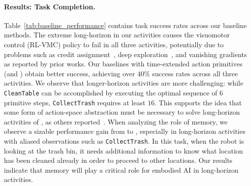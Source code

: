 \paragraph{Results: Task Completion.} Table~\ref{tab:baseline_performance} contains task success rates across our baseline methods. The extreme long-horizon in our activities causes the visuomotor control (RL-VMC) policy to fail in all three activities, potentially due to problems such as credit assignment~\cite{alipov2021towards}, deep exploration~\cite{yang2021exploration,JMLR:v20:18-339}, and vanishing gradients~\cite{10.1142/S0218488598000094} as reported by prior works.
Our baselines with time-extended action primitives (\rlprim and \rlprimhist) obtain better success, achieving over 40\% success rates across all three activities. We observe that longer-horizon activities are more challenging: while \texttt{CleanTable} can be accomplished by executing the optimal sequence of 6 primitive steps, \texttt{CollectTrash} requires at least $16$.
This supports the idea that some form of action-space abstraction must be necessary to solve long-horizon activities of \benchmark, as others reported~\cite{srivastava2021behavior, szot2021habitat,xia2020relmogen}.
When analyzing the role of memory, we observe a sizable performance gain from \rlprim to \rlprimhist, especially in long-horizon activities with aliased observations such as \texttt{CollectTrash}. In this task, when the robot is looking at the trash bin, it needs additional information to know what location has been cleaned already in order to proceed to other locations.
Our results indicate that memory will play a critical role for embodied AI in long-horizon \benchmark activities.

